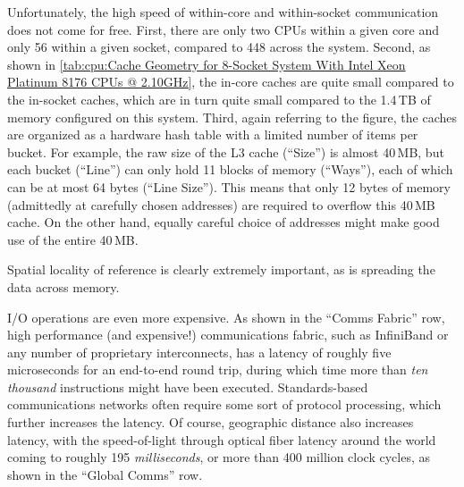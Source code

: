 Unfortunately, the high speed of within-core and within-socket communication
does not come for free.
First, there are only two CPUs within a given core and only 56 within
a given socket, compared to 448 across the system.
Second, as shown in
\cref{tab:cpu:Cache Geometry for 8-Socket System With Intel Xeon Platinum 8176 CPUs @ 2.10GHz},
the in-core caches are quite small compared to the in-socket caches, which
are in turn quite small compared to the 1.4\,TB of memory configured on
this system.
Third, again referring to the figure, the caches are organized as
a hardware hash table with a limited number of items per bucket.
For example, the raw size of the L3 cache (``Size'') is almost 40\,MB, but each
bucket (``Line'') can only hold 11 blocks of memory (``Ways''), each
of which can be at most 64 bytes (``Line Size'').
This means that only 12 bytes of memory (admittedly at carefully chosen
addresses) are required to overflow this 40\,MB cache.
On the other hand, equally careful choice of addresses might make good
use of the entire 40\,MB.

Spatial locality of reference is clearly extremely important, as is
spreading the data across memory.

I/O operations are even more expensive.
As shown in the ``Comms Fabric'' row,
high performance (and expensive!) communications fabric, such as
InfiniBand or any number of proprietary interconnects, has a latency
of roughly five microseconds for an end-to-end round trip, during which
time more than \emph{ten thousand} instructions might have been executed.
Standards-based communications networks often require some sort of
protocol processing, which further increases the latency.
Of course, geographic distance also increases latency, with the
speed-of-light through optical fiber latency around the world coming to
roughly 195 \emph{milliseconds}, or more than 400 million clock
cycles, as shown in the ``Global Comms'' row.


\QuickQuizEnd

